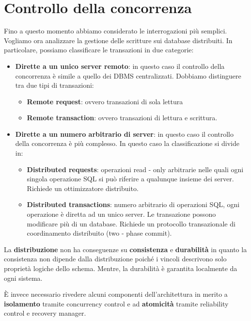 \section{Controllo della concorrenza}
Fino a questo momento abbiamo considerato le interrogazioni più semplici. Vogliamo
ora analizzare la gestione delle scritture sui database distribuiti. In particolare,
possiamo classificare le transazioni in due categorie:
\begin{itemize}
    \item \textbf{Dirette a un unico server remoto}: in questo caso il controllo
          della concorrenza è simile a quello dei DBMS centralizzati. Dobbiamo
          distinguere tra due tipi di transazioni:
          \begin{itemize}
              \item \textbf{Remote request}: ovvero transazioni di sola lettura
              \item \textbf{Remote transaction}: ovvero transazioni di lettura e scrittura.
          \end{itemize}
    \item \textbf{Dirette a un numero arbitrario di server}: in questo caso il
          controllo della concorrenza è più complesso. In questo caso la
          classificazione si divide in:
          \begin{itemize}
              \item \textbf{Distributed requests}: operazioni read - only
                    arbitrarie nelle quali ogni singola operazione SQL si può riferire
                    a qualunque insieme dei server. Richiede un ottimizzatore distribuito.
              \item \textbf{Distributed transactions}: numero arbitrario di
                    operazioni SQL, ogni operazione è diretta ad un unico server.
                    Le transazione possono modificare più di un database. Richiede
                    un protocollo transazionale di coordinamento distribuito (two
                    - phase commit).
          \end{itemize}
\end{itemize}

La \textbf{distribuzione} non ha conseguenze su \textbf{consistenza} e \textbf{durabilità} in quanto la
consistenza non dipende dalla distribuzione poiché i vincoli descrivono solo
proprietà logiche dello schema. Mentre, la durabilità è garantita localmente da
ogni sistema.

È invece necessario rivedere alcuni componenti dell'architettura in merito a
\textbf{isolamento} tramite concurrency control e ad \textbf{atomicità} tramite
reliability control e recovery manager.

